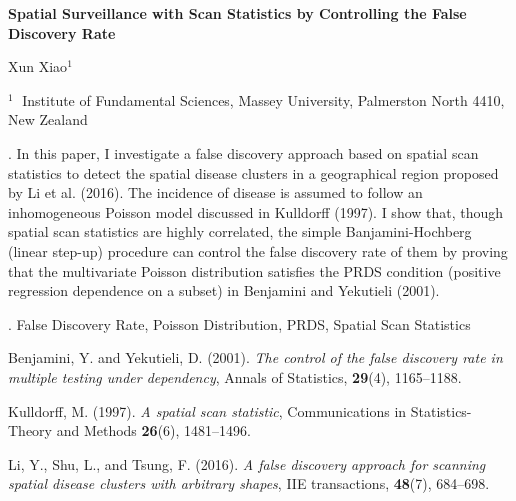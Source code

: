 \documentclass[12pt]{article}
\begin{document}
\begin{flushleft}


{\LARGE\bf Spatial Surveillance with Scan Statistics by Controlling the False Discovery Rate}


\vspace{1.0cm}

Xun Xiao$^1$

\begin{description}

\item $^1 \;$ Institute of Fundamental Sciences, Massey University,
Palmerston North 4410, New Zealand

\end{description}

\end{flushleft}


\vspace{0.75cm}

. In this paper, I investigate a false discovery approach based on spatial scan statistics to detect the spatial disease clusters in a geographical region proposed by Li et al. (2016). The incidence of disease is assumed to follow an inhomogeneous Poisson model discussed in Kulldorff (1997). I show that, though spatial scan statistics are highly correlated, the simple Banjamini-Hochberg (linear step-up) procedure can control the false discovery rate of them by proving that the multivariate Poisson distribution satisfies the PRDS condition (positive regression dependence on a subset) in Benjamini and Yekutieli (2001). 

\vskip 2mm

.
False Discovery Rate, Poisson Distribution, PRDS, Spatial Scan Statistics 

\vskip 10mm


\begin{description}

\item
Benjamini, Y. and Yekutieli, D. (2001).
\textit{The control of the false discovery rate in multiple testing under dependency},
Annals of Statistics,
\textbf{29}(4), 1165--1188.


\item
Kulldorff, M. (1997).
\textit{A spatial scan statistic},
Communications in Statistics-Theory and Methods
\textbf{26}(6), 1481--1496.


\item
Li, Y., Shu, L., and Tsung, F. (2016).
\textit{A false discovery approach for scanning spatial disease clusters with arbitrary shapes},
IIE transactions,
\textbf{48}(7), 684--698.

\end{description}
\end{document}

